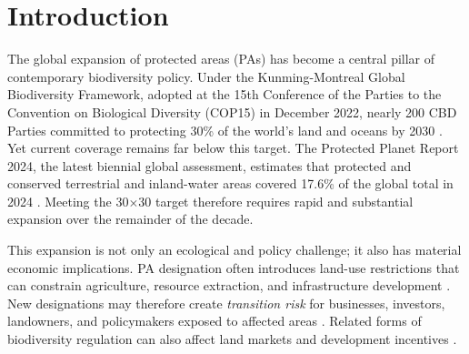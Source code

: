 \documentclass[12pt]{article}
\theoremstyle{break}
\begin{document}
\newpage
{}

\section{Introduction}
\label{sec:introduction}

The global expansion of protected areas (PAs) has become a central pillar of
contemporary biodiversity policy. Under the Kunming-Montreal Global Biodiversity
Framework, adopted at the 15th Conference of the Parties to the Convention on Biological Diversity (COP15) in December 2022, nearly 200 CBD Parties committed to
protecting 30\% of the world's land and oceans by 2030 \citep{cbd2022}. Yet current
coverage remains far below this target. The Protected Planet Report 2024, the latest
biennial global assessment, estimates that protected and conserved terrestrial and
inland-water areas covered 17.6\% of the global total in 2024
\citep{unepwcmc2024}. Meeting the 30$\times$30 target therefore requires rapid and
substantial expansion over the remainder of the decade.

This expansion is not only an ecological and policy challenge; it also has material
economic implications. PA designation often introduces land-use restrictions that can
constrain agriculture, resource extraction, and infrastructure development
\citep{dudley2008}. New designations may therefore create \emph{transition risk} for
businesses, investors, landowners, and policymakers exposed to affected areas
\citep{govind2025}. Related forms of biodiversity regulation can also affect land
markets and development incentives \citep{frank2025}.
\end{document}
